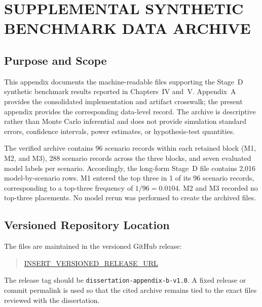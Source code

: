 
\chapter{SUPPLEMENTAL SYNTHETIC BENCHMARK DATA ARCHIVE}
\label{app:supplemental-benchmark-data}

\section{Purpose and Scope}

This appendix documents the machine-readable files supporting the Stage~D synthetic benchmark
results reported in Chapters~IV and~V. Appendix~A provides the consolidated implementation and
artifact crosswalk; the present appendix provides the corresponding data-level record. The archive
is descriptive rather than Monte Carlo inferential and does not provide simulation standard
errors, confidence intervals, power estimates, or hypothesis-test quantities.

The verified archive contains 96 scenario records within each retained block (M1, M2, and M3),
288 scenario records across the three blocks, and seven evaluated model labels per scenario.
Accordingly, the long-form Stage~D file contains 2,016 model-by-scenario rows. M1 entered the
top three in 1 of its 96 scenario records, corresponding to a top-three frequency of
\(1/96=0.0104\). M2 and M3 recorded no top-three placements. No model rerun was performed
to create the archived files.

\section{Versioned Repository Location}

The files are maintained in the versioned GitHub release:

\begin{quote}
\url{INSERT_VERSIONED_RELEASE_URL}
\end{quote}

The release tag should be \texttt{dissertation-appendix-b-v1.0}. A fixed release or commit
permalink is used so that the cited archive remains tied to the exact files reviewed with the
dissertation.

